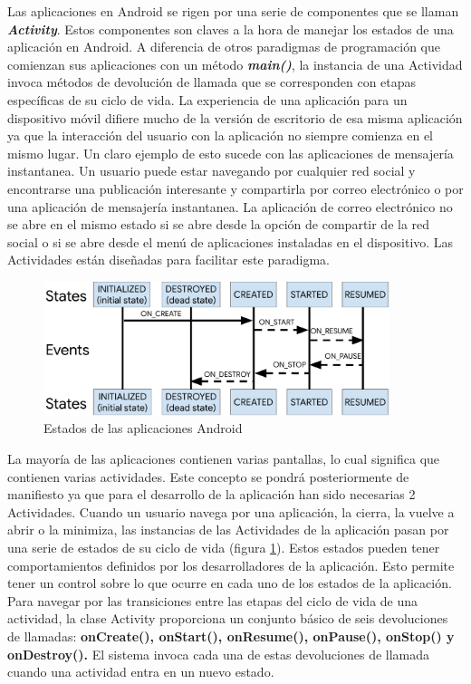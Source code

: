 Las aplicaciones en Android se rigen por una serie de componentes que se llaman \textbf{\textit{Activity}}. Estos componentes son claves a la hora de manejar los estados de una aplicaci\'on en Android. A diferencia de otros paradigmas de programaci\'on que comienzan sus aplicaciones con un m\'etodo \textbf{\textit{main()}}, la instancia de una Actividad invoca m\'etodos de devoluci\'on de llamada que se corresponden con etapas espec\'ificas de su ciclo de vida. La experiencia de una aplicaci\'on para un dispositivo m\'ovil difiere mucho de la versi\'on de escritorio de esa misma aplicaci\'on ya que la interacci\'on del usuario con la aplicaci\'on no siempre comienza en el mismo lugar. Un claro ejemplo de esto sucede con las aplicaciones de mensajer\'ia instantanea. Un usuario puede estar navegando por cualquier red social y encontrarse una publicaci\'on interesante y compartirla por correo electr\'onico o por una aplicaci\'on de mensajer\'ia instantanea. La aplicaci\'on de correo electr\'onico no se abre en el mismo estado si se abre desde la opci\'on de compartir de la red social o si se abre desde el men\'u de aplicaciones instaladas en el dispositivo. Las Actividades est\'an dise\~nadas para facilitar este paradigma.

\begin{figure}[!htb]
    \centering
    \includegraphics[width=0.90\textwidth]{./Imagenes/Vectorial/lifecycle-states.pdf}
    \caption{Estados de las aplicaciones Android}
\label{Fig:estados}
\end{figure}

La mayor\'ia de las aplicaciones contienen varias pantallas, lo cual significa que contienen varias actividades. Este concepto se pondr\'a posteriormente de manifiesto ya que para el desarrollo de la aplicaci\'on han sido necesarias 2 Actividades.
Cuando un usuario navega por una aplicaci\'on, la cierra, la vuelve a abrir o la minimiza, las instancias de las Actividades de la aplicaci\'on pasan por una serie de estados de su ciclo de vida (figura \ref{Fig:estados}). Estos estados pueden tener comportamientos definidos por los desarrolladores de la aplicaci\'on. Esto permite tener un control sobre lo que ocurre en cada uno de los estados de la aplicaci\'on. Para navegar por las transiciones entre las etapas del ciclo de vida de una actividad, la clase Activity proporciona un conjunto b\'asico de seis devoluciones de llamadas: \textbf{onCreate(), onStart(), onResume(), onPause(), onStop() y onDestroy().} El sistema invoca cada una de estas devoluciones de llamada cuando una actividad entra en un nuevo estado.


